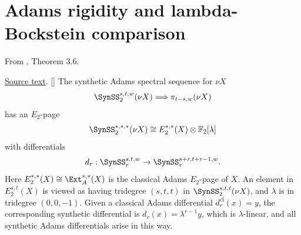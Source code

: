 \section{Adams rigidity and lambda-Bockstein comparison}

\begin{theorem}
\label{paper:3.6}
From \cite{LWX126}, Theorem 3.6.\par

\href{paper/main.tex.html#L799}{Source text}.
[{\cite[Theorem A.8]{BHS}}] \label{thm:rigid}
    The synthetic Adams spectral sequence for $\nu X$
     $$\SynSS_2^{s,t,w}(\nu X)\Longrightarrow \pi_{t-s,w}(\nu X)$$
     has an $E_2$-page 
    $$\SynSS_2^{*,*,*}(\nu X) \cong E_2^{*,*}(X)\otimes \mathbb{F}_2[\lambda]$$
    with differentials
    $$d_r: \SynSS_r^{s,t,w}\to \SynSS_r^{s+r,t+r-1,w}.$$
    Here $E_2^{*,*}(X) \cong \Ext_A^{*,*}(X)$ is the classical Adams $E_2$-page of $X$. An element in $E_2^{s,t}(X)$ is viewed as having tridegree $(s, t, t)$ in $\SynSS_2^{s,t,t}(\nu X)$, and $\lambda$ is in tridegree $(0, 0, -1)$. Given a classical Adams differential $d_r^{\mathrm{cl}}(x)=y$, the corresponding synthetic differential is $d_r(x)=\lambda^{r-1}y$, which is $\lambda$-linear, and all synthetic Adams differentials arise in this way.




\end{theorem}
